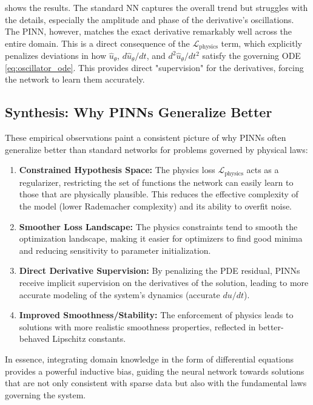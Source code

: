  shows the results. The standard NN captures the overall trend but struggles with the details, especially the amplitude and phase of the derivative's oscillations. The PINN, however, matches the exact derivative remarkably well across the entire domain. This is a direct consequence of the $\mathcal{L}_{\text{physics}}$ term, which explicitly penalizes deviations in how $\hat{u}_\theta$, $d\hat{u}_\theta/dt$, and $d^2\hat{u}_\theta/dt^2$ satisfy the governing ODE \eqref{eq:oscillator_ode}. This provides direct "supervision" for the derivatives, forcing the network to learn them accurately.

\subsection{Synthesis: Why PINNs Generalize Better}
\label{subsec:pinn_generalization_synthesis}

These empirical observations paint a consistent picture of why PINNs often generalize better than standard networks for problems governed by physical laws:

\begin{enumerate}
    \item \textbf{Constrained Hypothesis Space:} The physics loss $\mathcal{L}_{\text{physics}}$ acts as a regularizer, restricting the set of functions the network can easily learn to those that are physically plausible. This reduces the effective complexity of the model (lower Rademacher complexity) and its ability to overfit noise.
    \item \textbf{Smoother Loss Landscape:} The physics constraints tend to smooth the optimization landscape, making it easier for optimizers to find good minima and reducing sensitivity to parameter initialization.
    \item \textbf{Direct Derivative Supervision:} By penalizing the PDE residual, PINNs receive implicit supervision on the derivatives of the solution, leading to more accurate modeling of the system's dynamics (accurate $du/dt$).
    \item \textbf{Improved Smoothness/Stability:} The enforcement of physics leads to solutions with more realistic smoothness properties, reflected in better-behaved Lipschitz constants.
\end{enumerate}
In essence, integrating domain knowledge in the form of differential equations provides a powerful inductive bias, guiding the neural network towards solutions that are not only consistent with sparse data but also with the fundamental laws governing the system.

